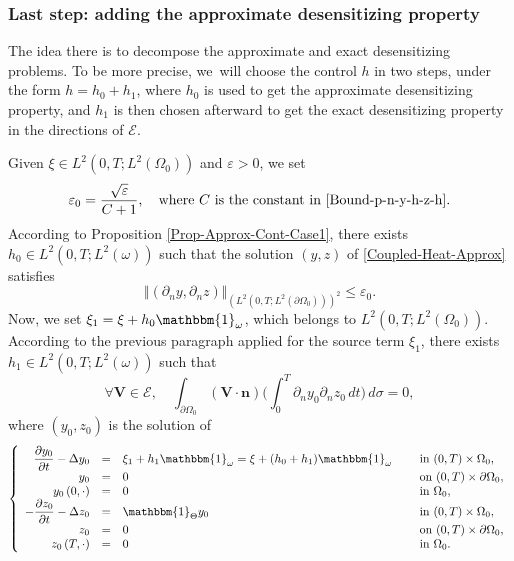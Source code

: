 \documentclass[JEP,XML,SOM,Unicode,NoFloatCountersInSection]{cedram}
\newcommand{\bn}{\boldsymbol{n}}
\newcommand{\bV}{\boldsymbol{V}}
\newcommand{\norm}[1]{\Vert#1\Vert}
\theoremstyle{definition}
\begin{document}
\subsubsection*{Last step: adding the approximate desensitizing property} The idea there is to decompose the approximate and exact desensitizing problems. To be more precise, we~will choose the control $h$ in two steps, under the form $h = h_0 + h_1$, where $h_0$ is used to get the approximate desensitizing property, and $h_1$ is then chosen afterward to get the exact desensitizing property in the directions of $\mathcal{E}$.

Given $\xi \in L^2(0,T; L^2(\Omega_0))$ and $\varepsilon >0$, we set
\begin{equation*}
\varepsilon_0 = \frac{{\sqrt{\varepsilon}}}{C+1}, \quad\text{where $C$ is the constant in \eqref{Bound-p-n-y-h-z-h}}.
\end{equation*}
According to Proposition \ref{Prop-Approx-Cont-Case1}, there exists $h_0 \in L^2(0,T; L^2(\omega))$ such that the solution $(y,z)$ of \eqref{Coupled-Heat-Approx} satisfies
\begin{equation}
\label{Approx-Result-First}
\norm{(\partial_n y, \partial_n z)}_{(L^2(0,T; L^2(\partial \Omega_0)))^2}
\leq
\varepsilon_0.
\end{equation}
Now, we set $\xi_1 = \xi + h_0 \mathbbm{1}_\omega$, which belongs to $L^2(0,T; L^2(\Omega_0))$. According to the previous paragraph applied for the source term $\xi_1$, there exists $h_1 \in L^2(0,T;L^2(\omega))$ such that
\begin{equation}
\label{Exact-insensitizing-E}
\forall \bV \in \mathcal{E},
\quad
\int_{\partial\Omega_{0}}(\bV\cdot \bn)
\biggl(\int_{0}^{T}\partial_{n}y_{0}\partial_{n} z_{0}\, dt \biggr)\,
d\sigma
=0,
\end{equation}
where $(y_0, z_0)$ is the solution of
\begin{equation}
\label{y-Omega-00}
\left\{
\begin{array}{rcll}
\dfrac{\partial y_0}{\partial t}-\Delta y_0 &=&\xi_1 +h_1\mathbbm{1}_{\omega}= \xi + (h_0 + h_1) \mathbbm{1}_\omega \quad&\text{ in }(0,T) \times \Omega_0,
\\
y_0 &=& 0 &\text{ on }(0,T) \times \partial \Omega_0,
\\
y_0\left(0,\cdot\right) &=& 0 &\text{ in }\Omega_0,
\\
-\dfrac{\partial z_0}{\partial t}-\Delta z_0 &=&\mathbbm{1}_{\Theta}y_0 &\text{ in }(0,T) \times \Omega_0,
\\
z_0 &=& 0 &\text{ on }(0,T) \times \partial \Omega_0,
\\
z_0\left(T,\cdot\right) &=& 0 &\text{ in }\Omega_0.
\end{array}
\right.
\end{equation}
\end{document}
